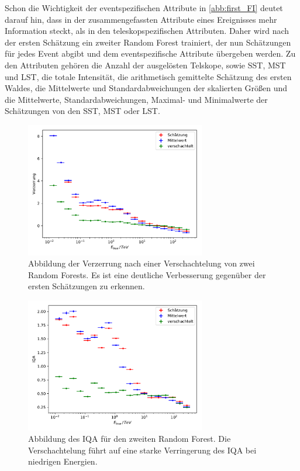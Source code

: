 Schon die Wichtigkeit der eventspezifischen Attribute in \autoref{abb:first_FI} deutet darauf hin, dass in der zusammengefassten Attribute eines Ereignisses
mehr Information steckt, als in den teleskopspezifischen Attributen.
Daher wird nach der ersten Schätzung ein zweiter Random Forest trainiert, der nun Schätzungen für jedes Event abgibt und dem eventspezifische Attribute
übergeben werden.
Zu den Attributen gehören die Anzahl der ausgelösten Telskope, sowie SST, MST und LST, die totale Intensität, die arithmetisch gemittelte Schätzung des
ersten Waldes, die Mittelwerte und Standardabweichungen der skalierten Größen und die Mittelwerte, Standardabweichungen, Maximal- und Minimalwerte der
Schätzungen von den SST, MST oder LST.
\begin{figure}
  \includegraphics[width=0.7\textwidth]{Plots/RF_nested_bias.pdf}
  \centering
  \caption{Abbildung der Verzerrung nach einer Verschachtelung von zwei Random Forests. Es ist eine deutliche Verbesserung gegenüber der ersten Schätzungen
            zu erkennen.}
  \label{abb:nest_bias}
\end{figure}
\begin{figure}
  \includegraphics[width=0.7\textwidth]{Plots/RF_nested_resolution.pdf}
  \centering
  \caption{Abbildung des IQA für den zweiten Random Forest. Die Verschachtelung führt auf eine starke Verringerung des IQA bei niedrigen Energien.}
  \label{abb:nest_IQA}
\end{figure}

